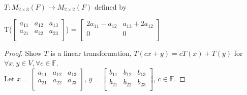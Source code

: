 \documentclass[12pt]{article}
\newenvironment{exercise}[2][Exercise]{\begin{trivlist}
\item[\hskip \labelsep{\bfseries #1}\hskip \labelsep{\bfseries #2.}]}{\end{trivlist}}
\begin{document}
\begin{exercise}{2.1.4} $T: M_{2\times3}(F) \to M_{2\times2}(F)$ defined by \\

    \begin{center}
        T\big($\begin{bmatrix}
            a_{11} & a_{12} & a_{13} \\
            a_{21} & a_{22} & a_{23} \\
        \end{bmatrix}$\big) = 
        $\begin{bmatrix}
            2a_{11} - a_{12} & a_{13} + 2a_{12} \\
            0 & 0 \\
        \end{bmatrix}$
    \end{center}

    \begin{proof} Show $T$ is a linear transformation, $T(cx + y) = cT(x) + T(y)$ for $\forall x, y \in V, \forall c \in \mathbb{F}$. \\

        \noindent Let 
        $x = \begin{bmatrix}
            a_{11} & a_{12} & a_{13} \\
            a_{21} & a_{22} & a_{23} \\
        \end{bmatrix}$, 
        $y = \begin{bmatrix}
            b_{11} & b_{12} & b_{13} \\
            b_{21} & b_{22} & b_{23} \\
        \end{bmatrix}$, 
        $c \in \mathbb{F}$.


\end{proof}
\end{exercise}
\end{document}
